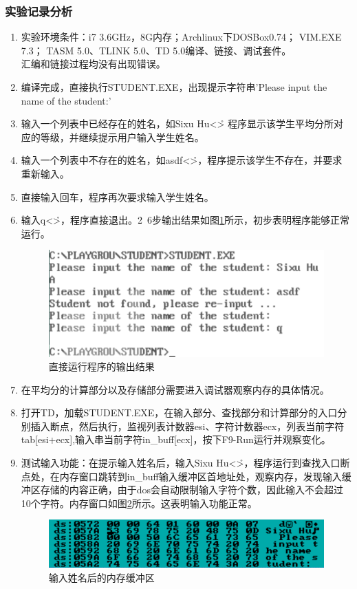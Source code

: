\documentclass{article}
\begin{document}
	\subsubsection{实验记录分析}
		\begin{enumerate}
			\item 实验环境条件：i7 3.6GHz，8G内存；Archlinux下DOSBox0.74； VIM.EXE 7.3； TASM 5.0、TLINK 5.0、TD 5.0编译、链接、调试套件。\\
				汇编和链接过程均没有出现错误。
			\item 编译完成，直接执行STUDENT.EXE，出现提示字符串’Please input the name of the student:’
			\item 输入一个列表中已经存在的姓名，如Sixu Hu<\r> 程序显示该学生平均分所对应的等级，并继续提示用户输入学生姓名。
			\item 输入一个列表中不存在的姓名，如asdf<\r>，程序提示该学生不存在，并要求重新输入。
			\item 直接输入回车，程序再次要求输入学生姓名。
			\item 输入q<\r>，程序直接退出。2~6步输出结果如图\ref{fig:fig15}所示，初步表明程序能够正常运行。
				\begin{figure}[h]
					\centering
					\includegraphics[width=0.8\linewidth]{res/homework_1/fig15.png}
					\caption{直接运行程序的输出结果}
					\label{fig:fig15}
				\end{figure}

			\item 在平均分的计算部分以及存储部分需要进入调试器观察内存的具体情况。
			\item 打开TD，加载STUDENT.EXE，在输入部分、查找部分和计算部分的入口分别插入断点，然后执行，监视列表计数器esi、字符计数器ecx，列表当前字符tab[esi+ecx],输入串当前字符in\_buff[ecx]，按下F9-Run运行并观察变化。
			\item 测试输入功能：在提示输入姓名后，输入Sixu Hu<\r>，程序运行到查找入口断点处，在内存窗口跳转到in\_buff输入缓冲区首地址处，观察内存，发现输入缓冲区存储的内容正确，由于dos会自动限制输入字符个数，因此输入不会超过10个字符。内存窗口如图\ref{fig:fig16}所示。这表明输入功能正常。
				\begin{figure}[h]
					\centering
					\includegraphics[width=0.8\linewidth]{res/homework_1/fig16.png}
					\caption{输入姓名后的内存缓冲区}
					\label{fig:fig16}
				\end{figure}


\end{enumerate}
\end{document}

